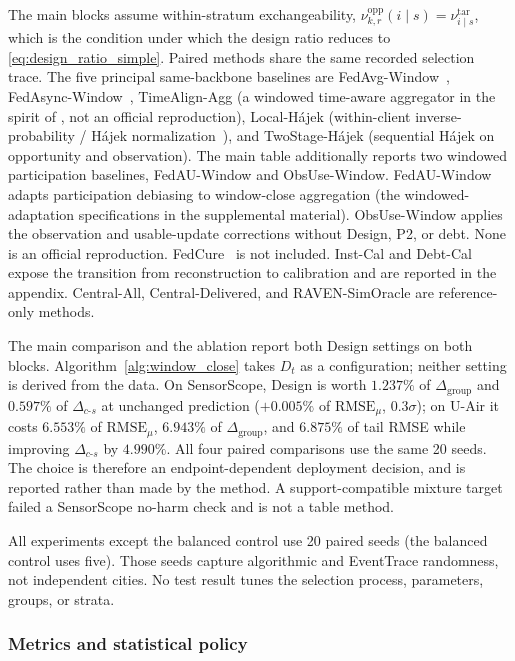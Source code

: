 \documentclass[letterpaper,journal]{IEEEtran}
\begin{document}
The main blocks assume within-stratum exchangeability,
$\nu^{\mathrm{opp}}_{k,r}(i\mid s)=\nu^{\mathrm{tar}}_{i\mid s}$, which is the
condition under which the design ratio reduces to
\eqref{eq:design_ratio_simple}.  Paired methods share the same recorded selection trace.
The five principal same-backbone baselines are
FedAvg-Window~\cite{mcmahan2017communication},
FedAsync-Window~\cite{xie2019asynchronous},
TimeAlign-Agg (a windowed time-aware aggregator in the spirit of
\cite{wang2026federated}, not an official reproduction),
Local-H\'ajek (within-client inverse-probability / H\'ajek
normalization~\cite{horvitz1952generalization,hajek1971comment}), and
TwoStage-H\'ajek (sequential H\'ajek on opportunity and
observation).  The main table additionally
reports two windowed participation baselines, FedAU-Window and
ObsUse-Window.  FedAU-Window adapts participation debiasing
\cite{wang2024lightweight} to window-close aggregation
(the windowed-adaptation specifications in the supplemental material).
ObsUse-Window applies the observation and usable-update
corrections without Design, P2, or debt.  None is an official
reproduction.  FedCure~\cite{chen2026fedcure} is not included.  Inst-Cal and Debt-Cal
expose the transition from reconstruction to calibration and are
reported in the appendix.  Central-All, Central-Delivered, and
RAVEN-SimOracle are reference-only methods.

The main comparison and the ablation report both Design settings on both
blocks.  Algorithm~\ref{alg:window_close} takes $D_t$ as a configuration;
neither setting is derived from the data.  On SensorScope, Design is worth
$1.237\%$ of $\Delta_{\mathrm{group}}$ and $0.597\%$ of
$\Delta_{c\text{-}s}$ at unchanged prediction ($+0.005\%$ of
$\mathrm{RMSE}_{\mu}$, $0.3\sigma$); on U-Air it costs $6.553\%$ of
$\mathrm{RMSE}_{\mu}$, $6.943\%$ of $\Delta_{\mathrm{group}}$, and $6.875\%$
of tail RMSE while improving $\Delta_{c\text{-}s}$ by $4.990\%$.  All four
paired comparisons use the same 20 seeds.  The choice is therefore an
endpoint-dependent deployment decision, and is reported rather than made by
the method.  A support-compatible mixture target failed a
SensorScope no-harm check and is not a table method.

All experiments except the balanced control use 20 paired seeds (the balanced control uses five).  Those seeds capture
algorithmic and EventTrace randomness, not independent cities.  No test
result tunes the selection process, parameters, groups, or strata.

\subsubsection{Metrics and statistical policy}
\end{document}
